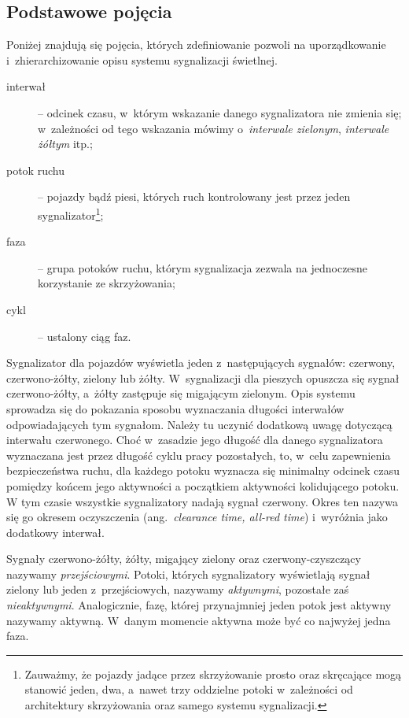 \documentclass{pracamgr}
\newcommand{\ang}[1]{(ang.~\emph{#1})}
\theoremstyle{plain}
\begin{document}
\subsection{Podstawowe pojęcia}
\label{ss:pojecia}

Poniżej znajdują się pojęcia, których zdefiniowanie pozwoli na
uporządkowanie i~zhierarchizowanie opisu systemu sygnalizacji
świetlnej.
\begin{description}
  \item[interwał] -- odcinek czasu, w~którym wskazanie danego
  sygnalizatora nie zmienia się; w~zależności od tego wskazania mówimy
  o~\emph{interwale zielonym}, \emph{interwale żółtym} itp.;
  \item[potok ruchu] -- pojazdy bądź piesi, których ruch kontrolowany
  jest przez jeden sygnalizator\footnote{Zauważmy, że pojazdy jadące
    przez skrzyżowanie prosto oraz skręcające mogą stanowić jeden,
    dwa, a~nawet trzy oddzielne potoki w~zależności od architektury
    skrzyżowania oraz samego systemu sygnalizacji.};
  \item[faza] -- grupa potoków ruchu, którym sygnalizacja zezwala na
  jednoczesne korzystanie ze skrzyżowania;
  \item[cykl] -- ustalony ciąg faz.
\end{description}

Sygnalizator dla pojazdów wyświetla jeden z~następujących sygnałów:
czerwony, czerwono-żółty, zielony lub żółty. W~sygnalizacji dla
pieszych opuszcza się sygnał czerwono-żółty, a~żółty zastępuje się
migającym zielonym. Opis systemu sprowadza się do pokazania sposobu
wyznaczania długości interwałów odpowiadających tym sygnałom. Należy
tu uczynić dodatkową uwagę dotyczącą interwału czerwonego. Choć w~zasadzie jego
długość dla danego sygnalizatora wyznaczana jest przez długość cyklu
pracy pozostałych, to, w~celu zapewnienia bezpieczeństwa ruchu, dla
każdego potoku wyznacza się minimalny odcinek czasu pomiędzy końcem
jego aktywności a początkiem aktywności kolidującego potoku. W tym
czasie wszystkie sygnalizatory nadają sygnał czerwony. Okres ten
nazywa się go okresem oczyszczenia \ang{clearance time, all-red time}
i~wyróżnia jako dodatkowy interwał.

Sygnały czerwono-żółty, żółty, migający zielony oraz
czerwony-czyszczący nazywamy \emph{przejściowymi}. Potoki, których
sygnalizatory wyświetlają sygnał zielony lub jeden z~przejściowych,
nazywamy \emph{aktywnymi}, pozostałe zaś
\emph{nieaktywnymi}. Analogicznie, fazę, której przynajmniej jeden
potok jest aktywny nazywamy aktywną. W~danym momencie aktywna może być
co najwyżej jedna faza.
\end{document}
